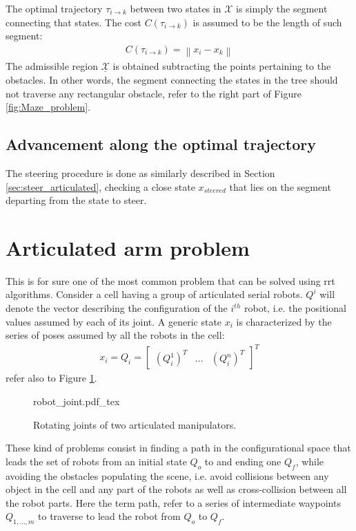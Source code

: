 The optimal trajectory $\tau_{i \rightarrow k}$ between two states in $\mathcal{X}$ is simply the segment connecting that states. 
The cost $C(\tau_{i \rightarrow k})$ is assumed to be the length of such segment:
\begin{eqnarray}
C(\tau_{i \rightarrow k}) = \left \| x_i - x_k \right \|
\end{eqnarray}
The admissible region $\underline{\mathcal{X}}$ is obtained subtracting the points pertaining to the obstacles. In other words, the segment connecting the states in the tree should not traverse any rectangular obstacle, refer to the right part of Figure \ref{fig:Maze_problem}.

\subsection{Advancement along the optimal trajectory}

The steering procedure is done as similarly described in Section \ref{sec:steer_articulated}, checking a close state $x_{steered}$ that lies on the segment departing from the state to steer.

\section{Articulated arm problem}

This is for sure one of the most common problem that can be solved using rrt algorithms. Consider a cell having a group of articulated serial robots.
$Q^{i}$ will denote the vector describing the configuration of the $i^{th}$ robot, i.e. the positional values assumed by each of its joint.
A generic state $x_i$ is characterized by the series of poses assumed by all the robots in the cell:
\begin{eqnarray}
x_i = Q_i = \begin{bmatrix} (Q^1_i)^T & \hdots & (Q^n_i)^T \end{bmatrix}^T
\end{eqnarray}
refer also to Figure \ref{fig:q_example}.

 \begin{figure}
	 \centering
 \def\svgwidth{0.8 \columnwidth}
 {robot_joint.pdf_tex} 
	 \caption{Rotating joints of two articulated manipulators.}
 \label{fig:q_example}
 \end{figure}

These kind of problems consist in finding a path in the configurational space that leads the set of robots from an initial state $Q_o$ to and ending one $Q_f$, while avoiding the obstacles populating the scene, i.e. avoid collisions between any object in the cell and any part of the robots as well as cross-collision between all the robot parts. Here the term path, refer to a series of intermediate waypoints $Q_{1,\hdots,m}$ to traverse to lead the robot from $Q_o$ to $Q_f$. 

